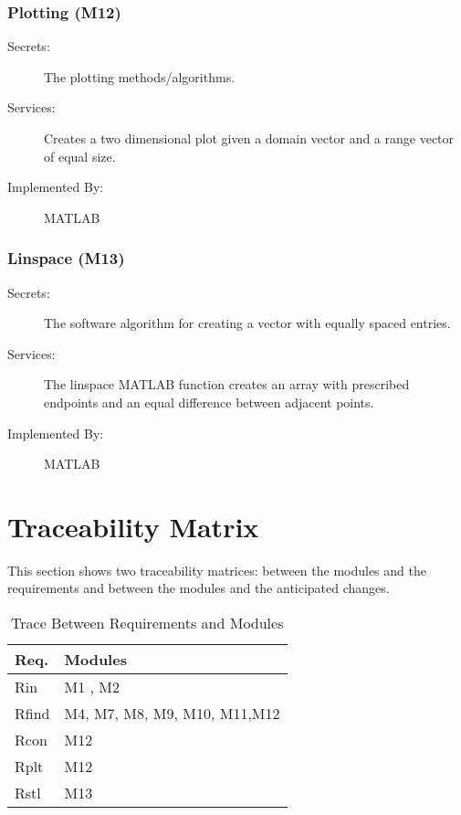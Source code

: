 \documentclass[12pt, titlepage]{article}
\begin{document}
\subsubsection{Plotting (M12)} 

\begin{description}
	\item[Secrets:] The plotting methods/algorithms.
	\item[Services:] Creates a two dimensional plot given a domain vector and a 
	range vector of equal size.  
	\item[Implemented By:] MATLAB
\end{description} 

\subsubsection{Linspace (M13)} 

\begin{description}
	\item[Secrets:] The software algorithm for creating a vector with equally 
	spaced entries. 
	\item[Services:] The linspace MATLAB function creates an array with 
	prescribed 
	endpoints and an equal difference between adjacent points.
	\item[Implemented By:] MATLAB
\end{description} 

\section{Traceability Matrix} \label{SecTM}

This section shows two traceability matrices: between the modules and the
requirements and between the modules and the anticipated changes.

\begin{table}[H]
\centering
\begin{tabular}{p{} p{}}
\toprule
\textbf{Req.} & \textbf{Modules}\\
\midrule
Rin & M1 , M2 \\
Rfind & M4, M7, M8, M9, M10, M11,M12\\
Rcon & M12\\
Rplt & M12 \\
Rstl & M13\\
\bottomrule
\end{tabular}
\caption{Trace Between Requirements and Modules}
\label{TblRT}
\end{table}
\end{document}
